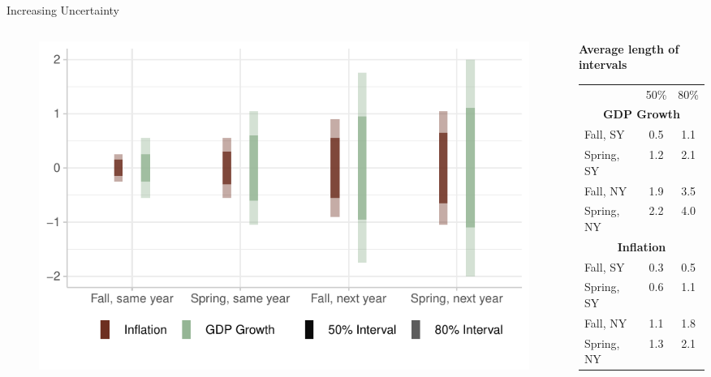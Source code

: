 \documentclass[en]{sdqbeamer}
\begin{document}
\begin{frame}{Increasing Uncertainty}
\begin{columns}
\begin{column}{0.6\textwidth}
    \begin{figure}
        \centering
        \includegraphics[width=\textwidth]{figures/horizon_uncc.pdf}
        \label{fig:enter-label}
    \end{figure}
\end{column}
\begin{column}{0.4\textwidth}
\centering
\textbf{Average length of intervals}
\begin{table}
\begin{tabular}{ l c c }
&   50\%  & 80\%\\[0.3em]
\multicolumn{3}{c}{\textbf{GDP Growth}}\\
Fall,  SY & 0.5 & 1.1\\ 
Spring, SY &1.2 &2.1 \\ 
Fall, NY & 1.9 & 3.5\\ 
Spring, NY &2.2 &4.0 \\[0.3em] 
\multicolumn{3}{c}{\textbf{Inflation}}\\
Fall,  SY & 0.3 & 0.5\\ 
Spring, SY &0.6 &1.1 \\ 
Fall, NY & 1.1 & 1.8\\ 
Spring, NY &1.3 &2.1 \\ 
\end{tabular}
\end{table}
\vspace{1.25cm}
\end{column}
\end{columns}


\end{frame}
\end{document}
